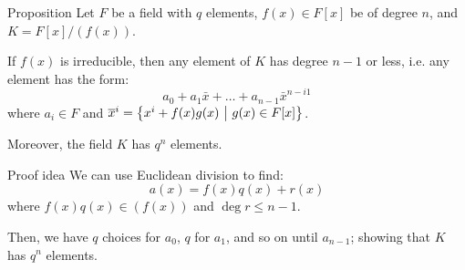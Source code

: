 \documentclass[a4paper]{article}
\begin{document}
\begin{parag}{Proposition}
    Let $F$ be a field with $q$ elements, $f\left(x\right) \in F\left[x\right]$ be of degree $n$, and $K = F\left[x\right] / \left(f\left(x\right)\right)$.

    If $f\left(x\right)$ is irreducible, then any element of $K$ has degree $n-1$ or less, i.e. any element has the form: 
    \[a_0 + a_1 \bar{x} + \ldots + a_{n-1} \bar{x}^{n-i1}\]
    where $a_i \in F$ and $\bar{x}^i = \left\{x^i + f\left(x\right)g\left(x\right) \suchthat g\left(x\right) \in F\left[x\right]\right\}$.

    Moreover, the field $K$ has $q^n$ elements.

    \begin{subparag}{Proof idea}
        We can use Euclidean division to find: 
        \[a\left(x\right) = f\left(x\right)q\left(x\right) + r\left(x\right)\]
        where $f\left(x\right)q\left(x\right) \in \left(f\left(x\right)\right)$ and $\deg r \leq n-1$.

        Then, we have $q$ choices for $a_0$, $q$ for $a_1$, and so on until $a_{n-1}$; showing that $K$ has $q^n$ elements.
    \end{subparag}
\end{parag}
\end{document}
